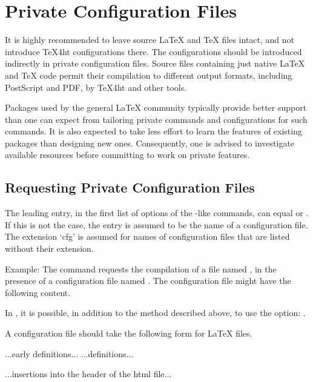 \section{Private Configuration Files}\label{sec:private-configuration}

It is highly recommended to leave source LaTeX and TeX files intact, and not
introduce TeX4ht configurations there. The configurations should be introduced
indirectly in private configuration files. Source files containing just native
LaTeX and TeX code permit their compilation to different output formats,
including PostScript and PDF, by TeX4ht and other tools.

Packages used by the general LaTeX community typically provide better support
than one can expect from tailoring private commands and configurations for such
commands. It is also expected to take less effort to learn the features of
existing packages than designing new ones. Consequently, one is advised to
investigate available resources before committing to work on private features. 

\subsection{Requesting Private Configuration Files}

The leading entry, in the first list of options of the -like
commands, can equal  or . If this is not the case,
the entry is assumed to be the name of a configuration file. The extension
‘cfg’ is assumed for names of configuration files that are listed without their
extension.

Example: The command  requests the
compilation of a file named , in the presence of a
configuration file named . The configuration file might have the
following content.

In , it is possible, in addition to the method described
above, to use the  option: .


A configuration file should take the following form for LaTeX files.

\begin{texsource}
...early definitions...
...definitions...

...insertions into the header of the html file...
\EndPreamble
\end{texsource}

